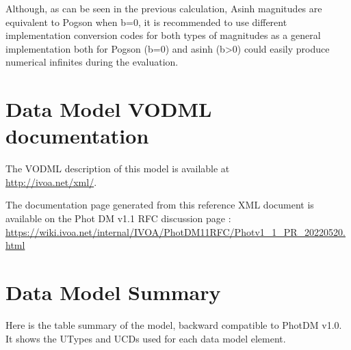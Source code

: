 \documentclass[11pt,a4paper]{ivoa}
\begin{document}
\begin{appendices}
Although, as can be seen in the previous calculation, Asinh magnitudes are equivalent to Pogson
when b=0, it is recommended to use different implementation conversion codes for both types of magnitudes as a general implementation both for Pogson (b=0) and asinh (b>0) could easily produce numerical infinites during the evaluation.
\par
\section{Data Model VODML documentation}

The VODML description of this model is available at \\ \url{http://ivoa.net/xml/}.

The documentation page generated from this reference XML document is available on the Phot DM v1.1 RFC discussion page : \\
\url{https://wiki.ivoa.net/internal/IVOA/PhotDM11RFC/Photv1_1_PR_20220520.html}

\section{Data Model Summary}
Here is the table summary  of the model, backward compatible to PhotDM v1.0. 
It shows the UTypes and UCDs used for each data model element. 



\end{appendices}
\end{document}
